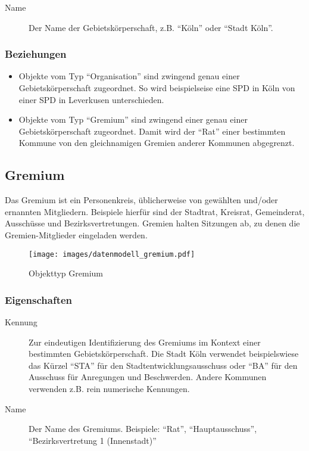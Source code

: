 \documentclass[,a4paper]{article}
\makeatletter
\def\maxwidth{\ifdim\Gin@nat@width>\linewidth\linewidth
\else\Gin@nat@width\fi}
\let\Oldincludegraphics\includegraphics
\renewcommand{\includegraphics}[1]{\Oldincludegraphics[width=\maxwidth]{#1}}
\makeatother
\begin{document}
\begin{description}
\item[Name]
Der Name der Gebietskörperschaft, z.B. ``Köln'' oder ``Stadt Köln''.
\end{description}

\subsubsection{Beziehungen}

\begin{itemize}
\item
  Objekte vom Typ ``Organisation'' sind zwingend genau einer
  Gebietskörperschaft zugeordnet. So wird beispielseise eine SPD in Köln
  von einer SPD in Leverkusen unterschieden.
\item
  Objekte vom Typ ``Gremium'' sind zwingend einer genau einer
  Gebietskörperschaft zugeordnet. Damit wird der ``Rat'' einer
  bestimmten Kommune von den gleichnamigen Gremien anderer Kommunen
  abgegrenzt.
\end{itemize}

\subsection{Gremium}

Das Gremium ist ein Personenkreis, üblicherweise von gewählten und/oder
ernannten Mitgliedern. Beispiele hierfür sind der Stadtrat, Kreisrat,
Gemeinderat, Ausschüsse und Bezirksvertretungen. Gremien halten
Sitzungen ab, zu denen die Gremien-Mitglieder eingeladen werden.

\begin{figure}[htbp]
\centering
\texttt{[image: images/datenmodell\_gremium.pdf]}
\caption{Objekttyp Gremium}
\end{figure}

\subsubsection{Eigenschaften}

\begin{description}
\item[Kennung]
Zur eindeutigen Identifizierung des Gremiums im Kontext einer bestimmten
Gebietskörperschaft. Die Stadt Köln verwendet beispielswiese das Kürzel
``STA'' für den Stadtentwicklungsausschuss oder ``BA'' für den Ausschuss
für Anregungen und Beschwerden. Andere Kommunen verwenden z.B. rein
numerische Kennungen.
\item[Name]
Der Name des Gremiums. Beispiele: ``Rat'', ``Hauptausschuss'',
``Bezirksvertretung 1 (Innenstadt)''
\end{description}
\end{document}
